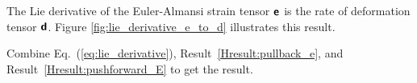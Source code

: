 \begin{Hresult}
The Lie derivative of the Euler-Almansi strain tensor $\mbox{\sffamily\bfseries e}$ is the rate of deformation tensor $\mbox{\sffamily\bfseries d}$.  Figure \ref{fig:lie_derivative_e_to_d} illustrates this result.
    \label{Hresult:e_to_d}
\end{Hresult}

\begin{Hproof}
Combine Eq.~(\ref{eq:lie_derivative}), Result~\ref{Hresult:pullback_e}, and 
    Result~\ref{Hresult:pushforward_E} to get the result.
\end{Hproof}



